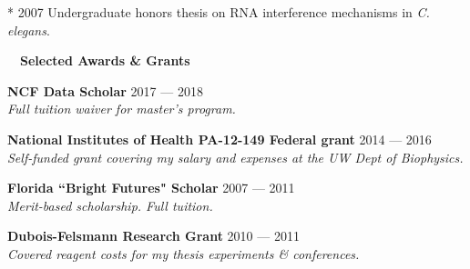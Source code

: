 \documentclass[a4paper,12pt]{article}
\newcommand{\resheading}[1]{{\hspace{-9pt} \colorbox{mygrey}{\begin{minipage}{\textwidth}{\textmd{~~\large \textbf{#1} \vphantom{p\^{E}}}}\end{minipage}}\vspace{6pt}} }
\newcommand{\ressubheading}[4]{{\begin{minipage}{\textwidth}
                                    \textbf{#1} \hfill #2 \\
                                    \textit{#3} \hfill #4 \\
\end{minipage}}}
\begin{document}
    * 2007 Undergraduate honors thesis on RNA interference mechanisms in \textit{C. elegans}.\\


    \resheading{Selected Awards \& Grants}
    \ressubheading{NCF Data Scholar}{2017 --- 2018}{Full tuition waiver for master's program.}{}

    \ressubheading{National Institutes of Health PA-12-149 Federal grant}{2014 --- 2016}{Self-funded grant covering my salary and expenses at the UW Dept of Biophysics.}{}


    \ressubheading{Florida ``Bright Futures" Scholar}{2007 --- 2011}{Merit-based scholarship. Full tuition.}{}

    \ressubheading{Dubois-Felsmann Research Grant}{2010 --- 2011}{Covered reagent costs for my thesis experiments \& conferences.}{}
\end{document}
